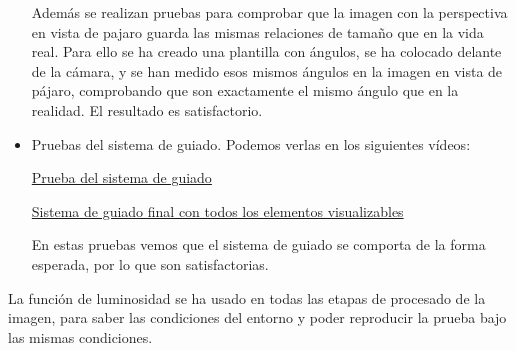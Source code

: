 \begin{itemize}
	Además se realizan pruebas para comprobar que la imagen con la perspectiva en vista de pajaro guarda las mismas relaciones de tamaño que en la vida real. Para ello se ha creado una plantilla con ángulos, se ha colocado delante de la cámara, y se han medido esos mismos ángulos en la imagen en vista de pájaro, comprobando que son exactamente el mismo ángulo que en la realidad. El resultado es satisfactorio.
	
	\item Pruebas del sistema de guiado. Podemos verlas en los siguientes vídeos:
	
	\href{https://youtu.be/ODr3q91MLk0}{Prueba del sistema de guiado}
	
	\href{https://youtu.be/8j69cDydXfA}{Sistema de guiado final con todos los elementos visualizables}
	
	En estas pruebas vemos que el sistema de guiado se comporta de la forma esperada, por lo que son satisfactorias.
	
\end{itemize}

La función de luminosidad se ha usado en todas las etapas de procesado de la imagen, para saber las condiciones del entorno y poder reproducir la prueba bajo las mismas condiciones.
